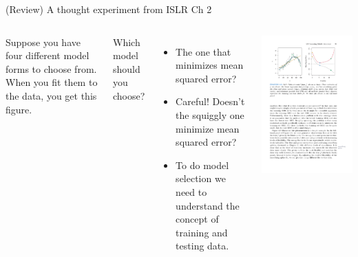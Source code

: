 \documentclass[aspectratio=169]{beamer}
\begin{document}
\begin{frame}{(Review) A thought experiment from ISLR Ch 2}

\begin{columns}
Suppose you have four different model forms to choose from.  When you fit them to the data, you get this figure.

\vspace{5mm}

Which model should you choose?  
\begin{itemize}
\item The one that minimizes mean squared error?
\item Careful!  Doesn't the squiggly one minimize mean squared error?
\item To do model selection we need to understand the concept of training and testing data.
\end{itemize}

\includegraphics[scale=1]{figures/islr2_9a.pdf}
\end{columns}

\end{frame}
\end{document}
